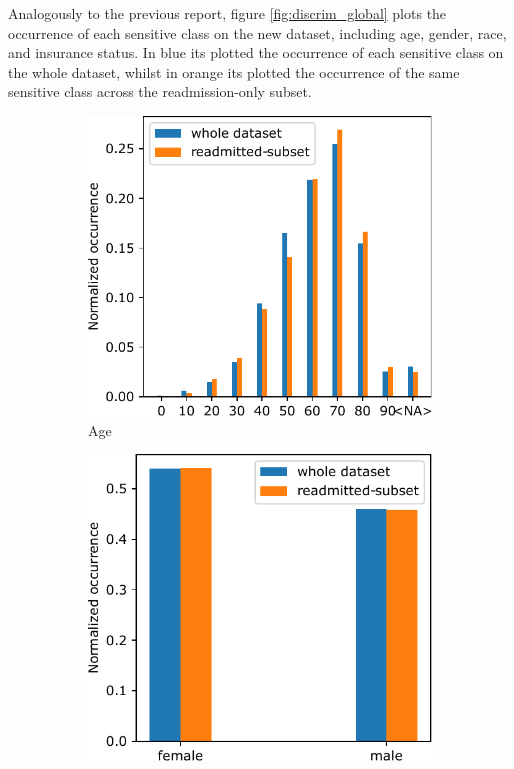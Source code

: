 \documentclass[a4paper,11pt]{article}
\begin{document}
Analogously to the previous report, figure \ref{fig:discrim_global} plots the occurrence of each sensitive class on the new dataset, including age, gender, race, and insurance status. In blue its plotted the occurrence of each sensitive class on the whole dataset, whilst in orange its plotted the occurrence of the same sensitive class across the readmission-only subset.


\begin{figure}[htb]
\centering
\begin{subfigure}{0.24\textwidth}
    \includegraphics[width=\textwidth]{images/week1_discrim_global_age.pdf}
    \caption{Age}
    \label{fig:discrim_global_age}
\end{subfigure}
\hfill
\begin{subfigure}{0.24\textwidth}
    \includegraphics[width=\textwidth]{images/week1_discrim_global_gender.pdf}

\end{subfigure}
\end{figure}
\end{document}
